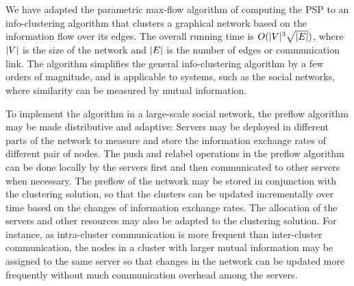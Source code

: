 \documentclass[conference,letterpaper]{IEEEtran}
\begin{document}
We have adapted the parametric max-flow algorithm of computing the PSP to an info-clustering algorithm that clusters a graphical network based on the information flow over its edges. The overall running time is $O(\lvert V\rvert^3\sqrt {\lvert E\rvert})$, where $\lvert V\rvert$ is the size of the network and $\lvert E\rvert$ is the number of edges or communication link. The algorithm simplifies the general info-clustering algorithm by a few orders of magnitude, and is applicable to systems, such as the social networks, where similarity can be measured by mutual information. 

To implement the algorithm in a large-scale social network, the preflow algorithm may be made distributive and adaptive: 
%
Servers may be deployed in different parts of the network to measure and store the information exchange rates of different pair of nodes. The push and relabel operations in the preflow algorithm can be done locally by the servers first and then communicated to other servers when necessary. 
%
The preflow of the network may be stored in conjunction with the clustering solution, so that the clusters can be updated incrementally over time based on the changes of information exchange rates. The allocation of the servers and other resources may also be adapted to the clustering solution. For instance, as intra-cluster communication is more frequent than inter-cluster communication, the nodes in a cluster with larger mutual information may be assigned to the same server so that changes in the network can be updated more frequently without much communication overhead among the servers.




\end{document}
